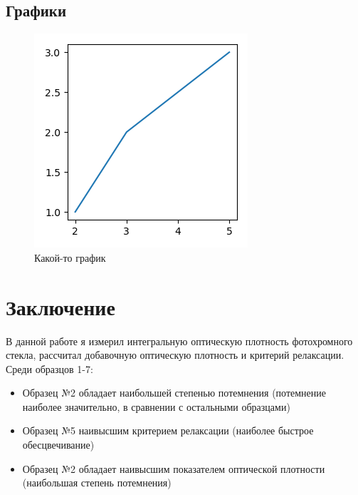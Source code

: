 \subsection{Графики}

\begin{figure}
        \centering
        \includegraphics{figures/example}
        \caption{Какой-то график}
		\label{fig:someFigure}
\end{figure}

\section*{Заключение}
В данной работе я измерил интегральную оптическую плотность фотохромного стекла, рассчитал добавочную оптическую плотность и критерий релаксации.
Среди образцов 1-7:
\begin{itemize}
	\item Образец №2 обладает наибольшей степенью потемнения (потемнение наиболее значительно, в сравнении с остальными образцами)
	\item Образец №5 наивысшим критерием релаксации (наиболее быстрое обесцвечивание)
	\item Образец №2 обладает наивысшим показателем оптической плотности (наибольшая степень потемнения)
\end{itemize}
